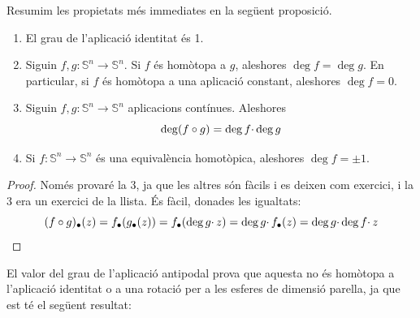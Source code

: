 \documentclass[../main.tex]{subfiles}
\begin{document}
Resumim les propietats més immediates en la següent proposició. 

\begin{prop}
\label{prop:propietatsgrau}
\begin{enumerate}[(1)]
    \item El grau de l'aplicació identitat és 1.
    \item Siguin $f,g:\mathbb{S}^n\rightarrow\mathbb{S}^n$. Si $f$ és homòtopa a $g$, aleshores $\deg f = \deg g$. En particular, si $f$ és homòtopa a una aplicació constant, aleshores $\deg f = 0$.
    \item Siguin $f,g:\mathbb{S}^n\rightarrow \mathbb{S}^n$ aplicacions contínues. Aleshores
    \begin{equation}
        \notag
        \deg(f\circ g) = \deg f\cdotp\deg g
    \end{equation}
    \item Si $f:\mathbb{S}^n\rightarrow\mathbb{S}^n$ és una equivalència homotòpica, aleshores $\deg f = \pm 1$.
\end{enumerate}
\end{prop}
\begin{proof}
Només provaré la 3, ja que les altres són fàcils i es deixen com exercici, i la 3 era un exercici de la llista. És fàcil, donades les igualtats:
\begin{equation}
    \notag
    (f\circ g)_\bullet(z) = f_\bullet(g_\bullet(z)) = f_\bullet(\deg g\cdotp z) = \deg g\cdotp f_\bullet(z) = \deg g\cdotp \deg f\cdotp z
\end{equation}
\end{proof}

El valor del grau de l'aplicació antipodal prova que aquesta no és homòtopa a l'aplicació identitat o a una rotació per a les esferes de dimensió parella, ja que est té el següent resultat:
\end{document}
